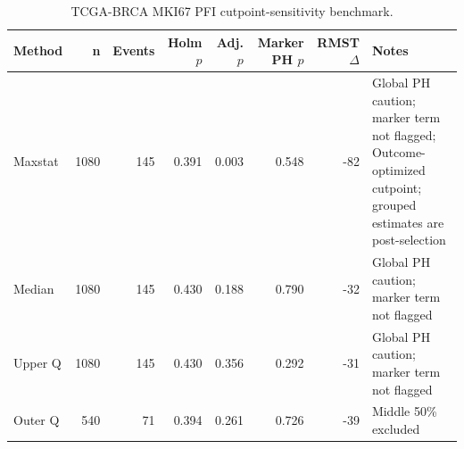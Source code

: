 \begin{table}[t]
\centering
\caption{TCGA-BRCA MKI67 PFI cutpoint-sensitivity benchmark.}
\label{tab:brca-mki67-pfi-cutpoints}
\begin{tabular}{lrrrrrrl}
\toprule
Method & n & Events & Holm $p$ & Adj. $p$ & Marker PH $p$ & RMST $\Delta$ & Notes \\
\midrule
Maxstat & 1080 & 145 & 0.391 & 0.003 & 0.548 & -82 & Global PH caution; marker term not flagged; Outcome-optimized cutpoint; grouped estimates are post-selection \\
Median & 1080 & 145 & 0.430 & 0.188 & 0.790 & -32 & Global PH caution; marker term not flagged \\
Upper Q & 1080 & 145 & 0.430 & 0.356 & 0.292 & -31 & Global PH caution; marker term not flagged \\
Outer Q & 540 & 71 & 0.394 & 0.261 & 0.726 & -39 & Middle 50\% excluded \\
\bottomrule
\end{tabular}
\end{table}
